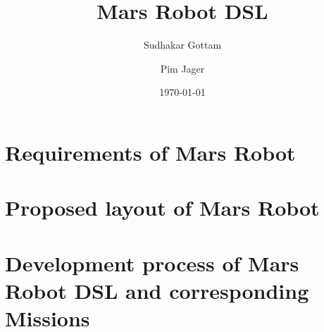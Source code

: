 \documentclass[titlepage]{article}
\author{%
	Sudhakar Gottam\and
	Pim Jager
}
\title{Mars Robot DSL}
\date{\today}
\begin{document}
\maketitle
\tableofcontents
\newpage

\section{Requirements of Mars Robot} \label{sec:requirements}
 

\section{Proposed layout of Mars Robot}


\section{Development process of Mars Robot DSL and corresponding Missions}

\end{document}
